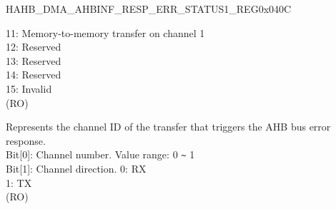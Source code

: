 \begin{register}{H}{AHB\_DMA\_AHBINF\_RESP\_ERR\_STATUS1\_REG}{0x040C}
\begin{regdesc}
\begin{reglist}
11: Memory-to-memory transfer on channel 1\\
12: Reserved\\
13: Reserved\\
14: Reserved\\
15: Invalid\\
(RO)
\label{fielddesc:AHBDMAAHBINFRESPERRCHID}\item [AHB\_DMA\_AHBINF\_RESP\_ERR\_CH\_ID] Represents the channel ID of the transfer that triggers the AHB bus error response.\\
Bit[0]: Channel number. Value range: 0 \verb+~+ 1\\
Bit[1]: Channel direction.
0: RX\\
1: TX\\ (RO)
\end{reglist}\end{regdesc}
\end{register}
